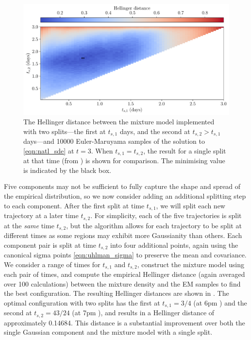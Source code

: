 \begin{figure}[t]
	\centering
	\includegraphics[width=\textwidth]{chp06_applications/figures/gulf_stream/hell_dist_2split}
	\caption{The Hellinger distance between the mixture model implemented with two splits---the first at \(t_{s,1}\) days, and the second at \(t_{s,2} > t_{s,1}\) days---and 10000 Euler-Maruyama samples of the solution to \cref{eqn:natl_sde} at \(t = 3\).
		When \(t_{s,1} = t_{s,2}\), the result for a single split at that time (from ) is shown for comparison.
		The minimising value is indicated by the black box.}
	\label{fig:na_2split_hell}
\end{figure}


Five components may not be sufficient to fully capture the shape and spread of the empirical distribution, so we now consider adding an additional splitting step to each component.
After the first split at time \(t_{s,1}\), we will split each new trajectory at a later time \(t_{s,2}\).
For simplicity, each of the five trajectories is split at the \emph{same} time \(t_{s,2}\), but the algorithm allows for each trajectory to be split at different times as some regions may exhibit more Gaussianity than others.
Each component pair is split at time \(t_{s,2}\) into four additional points, again using the canonical sigma points \cref{eqn:uhlman_sigma} to preserve the mean and covariance.
We consider a range of times for \(t_{s,1}\) and \(t_{s,2}\), construct the mixture model using each pair of times, and compute the empirical Hellinger distance (again averaged over 100 calculations) between the mixture density and the EM samples to find the best configuration.
The resulting Hellinger distances are shown in .
The optimal configuration with two splits has the first at \(t_{s,1} = 3/4\) (at 6pm ) and the second at \(t_{s,2} = 43/24\) (at 7pm ), and results in a Hellinger distance of approximately 0.14684.
This distance is a substantial improvement over both the single Gaussian component and the mixture model with a single split.


